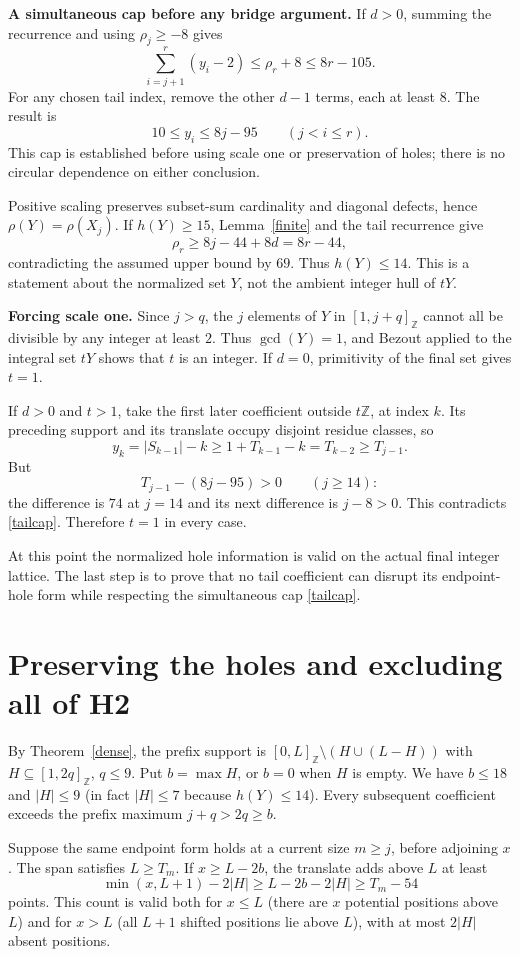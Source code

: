 \documentclass[11pt,a4paper]{article}
\newcommand{\Z}{\mathbb Z}
\newcommand{\ints}[2]{[#1,#2]_{\Z}}
\begin{document}
\textbf{A simultaneous cap before any bridge argument.} If $d>0$, summing the recurrence and using $\rho_j\ge-8$ gives
\[
\sum_{i=j+1}^r(y_i-2)\le\rho_r+8\le8r-105.
\]
For any chosen tail index, remove the other $d-1$ terms, each at least $8$. The result is
\begin{equation}
10\le y_i\le8j-95\qquad(j<i\le r).\label{tailcap}
\end{equation}
This cap is established before using scale one or preservation of holes; there is no circular dependence on either conclusion.

Positive scaling preserves subset-sum cardinality and diagonal defects, hence $\rho(Y)=\rho(X_j)$. If $h(Y)\ge15$, Lemma~\ref{finite} and the tail recurrence give
\[
\rho_r\ge8j-44+8d=8r-44,
\]
contradicting the assumed upper bound by $69$. Thus $h(Y)\le14$. This is a statement about the normalized set $Y$, not the ambient integer hull of $tY$.

\textbf{Forcing scale one.} Since $j>q$, the $j$ elements of $Y$ in $\ints1{j+q}$ cannot all be divisible by any integer at least $2$. Thus $\gcd(Y)=1$, and Bezout applied to the integral set $tY$ shows that $t$ is an integer. If $d=0$, primitivity of the final set gives $t=1$.

If $d>0$ and $t>1$, take the first later coefficient outside $t\Z$, at index $k$. Its preceding support and its translate occupy disjoint residue classes, so
\[
y_k=|S_{k-1}|-k\ge1+T_{k-1}-k=T_{k-2}\ge T_{j-1}.
\]
But
\[
T_{j-1}-(8j-95)>0\qquad(j\ge14):
\]
the difference is $74$ at $j=14$ and its next difference is $j-8>0$. This contradicts \eqref{tailcap}. Therefore $t=1$ in every case.

At this point the normalized hole information is valid on the actual final integer lattice. The last step is to prove that no tail coefficient can disrupt its endpoint-hole form while respecting the simultaneous cap \eqref{tailcap}.

\newpage
\section{Preserving the holes and excluding all of H2}
By Theorem~\ref{dense}, the prefix support is $\ints0L\setminus(H\cup(L-H))$ with $H\subseteq\ints1{2q}$, $q\le9$. Put $b=\max H$, or $b=0$ when $H$ is empty. We have $b\le18$ and $|H|\le9$ (in fact $|H|\le7$ because $h(Y)\le14$). Every subsequent coefficient exceeds the prefix maximum $j+q>2q\ge b$.

Suppose the same endpoint form holds at a current size $m\ge j$, before adjoining $x$. The span satisfies $L\ge T_m$. If $x\ge L-2b$, the translate adds above $L$ at least
\[
\min(x,L+1)-2|H|\ge L-2b-2|H|\ge T_m-54
\]
points. This count is valid both for $x\le L$ (there are $x$ potential positions above $L$) and for $x>L$ (all $L+1$ shifted positions lie above $L$), with at most $2|H|$ absent positions.
\end{document}
